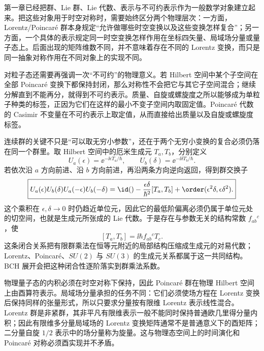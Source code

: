 第一章已经把群、Lie 群、Lie 代数、表示与不可约表示作为一般数学对象建立起来。把这些对象用于时空对称时，需要始终区分两个物理层次：一方面，Lorentz/Poincar\'e 群本身规定“允许做哪些时空变换以及这些变换怎样复合”；另一方面，一个具体的表示规定同一时空变换怎样作用在坐标四矢量、局域场分量或量子态上。后面出现的矩阵维数不同，并不意味着存在不同的 Lorentz 变换，而只是同一抽象对称作用在不同对象上的实现不同。

对粒子态还需要再强调一次“不可约”的物理意义。若 Hilbert 空间中某个子空间在全部 Poincar\'e 变换下都保持封闭，那么对称性不会把它与其它子空间混合；继续分解直到不能再分，就得到不可约表示。质量、自旋或螺旋度之所以能够成为单粒子种类的标签，正因为它们在这样的最小不变子空间内取固定值。Poincar\'e 代数的 Casimir 不变量在不可约表示上取定值，从而直接给出质量以及自旋或螺旋度标签。


连续群的关键不只是“可以取无穷小参数”，还在于两个无穷小变换的复合必须仍落在同一个群里。取 Hilbert 空间中的厄米生成元 $T_a,T_b$，分别定义
\begin{equation*}
 U_a(\epsilon)=\ee^{-\ii\epsilon T_a/\hbar},
 \qquad
 U_b(\delta)=\ee^{-\ii\delta T_b/\hbar}.
\end{equation*}
若依次沿 $a$ 方向前进、沿 $b$ 方向前进，再沿两条方向逆向返回，得到群交换子
\begin{equation}
\boxed{
 U_a(\epsilon)U_b(\delta)U_a(-\epsilon)U_b(-\delta)
 =\id()-\frac{\epsilon\delta}{\hbar^2}[T_a,T_b]
 +\order(\epsilon^2\delta,\epsilon\delta^2).}
\label{eq:group-commutator-bch-dp8}
\end{equation}
这个乘积在 $\epsilon,\delta\to0$ 时仍趋近单位元，因此它的最低阶偏离必须仍属于单位元处的切空间，也就是生成元所张成的 Lie 代数。于是存在与参数无关的结构常数 $f_{ab}{}^c$，使
\begin{equation}
\boxed{
 [T_a,T_b]=\ii\hbar f_{ab}{}^cT_c.}
\label{eq:lie-algebra-closure-dp68}
\end{equation}
这条闭合关系把有限群乘法在恒等元附近的局部结构压缩成生成元的对易代数；Lorentz、Poincar\'e、$SU(2)$ 与 $SU(3)$ 的生成元关系都属于这一共同结构。BCH 展开会把这种闭合性逐阶落实到群乘法系数。

\begin{note}[两种表示中的“酉”]
物理量子态的内积必须在时空对称下保持，因此 Poincar\'e 群在物理 Hilbert 空间上由酉算符表示。局域场分量承担的任务不同：它们必须使场方程在 Lorentz 变换后保持同样的张量形式，所以只要求分量按有限维 Lorentz 表示线性混合。Lorentz 群是非紧群，其非平凡有限维表示一般不能同时保持普通欧几里得分量内积；因此有限维多分量局域场的 Lorentz 变换矩阵通常不是普通意义下的酉矩阵；二分量自旋 $1/2$ 表示中的场分量称为旋量。这与物理态空间上的时间演化和 Poincar\'e 对称必须酉实现并不矛盾。
\end{note}
